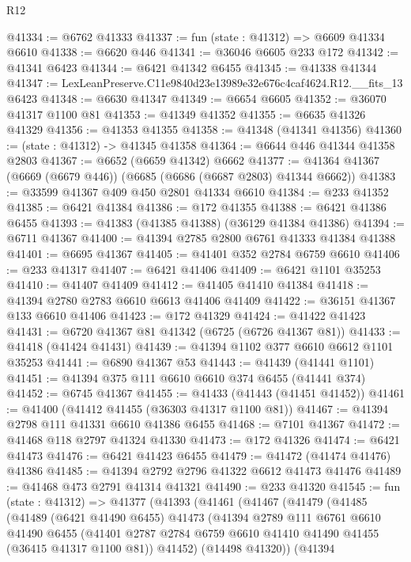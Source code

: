 \begin{lexlean}{R12}
\begin{coremodule}
@41334 := @6762 @41333
@41337 := fun (state : @41312) => @6609 @41334 @6610
@41338 := @6620 @446
@41341 := @36046 @6605 @233 @172
@41342 := @41341 @6423
@41344 := @6421 @41342 @6455
@41345 := @41338 @41344
@41347 := LexLeanPreserve.C11e9840d23e13989e32e676c4caf4624.R12.__fits_13 @6423
@41348 := @6630 @41347
@41349 := @6654 @6605
@41352 := @36070 @41317 @1100 @81
@41353 := @41349 @41352
@41355 := @6635 @41326 @41329
@41356 := @41353 @41355
@41358 := @41348 (@41341 @41356)
@41360 := (state : @41312) -> @41345 @41358
@41364 := @6644 @446 @41344 @41358 @2803
@41367 := @6652 (@6659 @41342) @6662
@41377 := @41364 @41367 (@6669 (@6679 @446)) (@6685 (@6686 (@6687 @2803) @41344 @6662))
@41383 := @33599 @41367 @409 @450 @2801 @41334 @6610
@41384 := @233 @41352
@41385 := @6421 @41384
@41386 := @172 @41355
@41388 := @6421 @41386 @6455
@41393 := @41383 (@41385 @41388) (@36129 @41384 @41386)
@41394 := @6711 @41367
@41400 := @41394 @2785 @2800 @6761 @41333 @41384 @41388
@41401 := @6695 @41367
@41405 := @41401 @352 @2784 @6759 @6610
@41406 := @233 @41317
@41407 := @6421 @41406
@41409 := @6421 @1101 @35253
@41410 := @41407 @41409
@41412 := @41405 @41410 @41384
@41418 := @41394 @2780 @2783 @6610 @6613 @41406 @41409
@41422 := @36151 @41367 @133 @6610 @41406
@41423 := @172 @41329
@41424 := @41422 @41423
@41431 := @6720 @41367 @81 @41342 (@6725 (@6726 @41367 @81))
@41433 := @41418 (@41424 @41431)
@41439 := @41394 @1102 @377 @6610 @6612 @1101 @35253
@41441 := @6890 @41367 @53
@41443 := @41439 (@41441 @1101)
@41451 := @41394 @375 @111 @6610 @6610 @374 @6455 (@41441 @374)
@41452 := @6745 @41367
@41455 := @41433 (@41443 (@41451 @41452))
@41461 := @41400 (@41412 @41455 (@36303 @41317 @1100 @81))
@41467 := @41394 @2798 @111 @41331 @6610 @41386 @6455
@41468 := @7101 @41367
@41472 := @41468 @118 @2797 @41324 @41330
@41473 := @172 @41326
@41474 := @6421 @41473
@41476 := @6421 @41423 @6455
@41479 := @41472 (@41474 @41476) @41386
@41485 := @41394 @2792 @2796 @41322 @6612 @41473 @41476
@41489 := @41468 @473 @2791 @41314 @41321
@41490 := @233 @41320
@41545 := fun (state : @41312) =>
  @41377
    (@41393
      (@41461
        (@41467
          (@41479
            (@41485
              (@41489
                (@6421 @41490 @6455)
                @41473
                (@41394
                  @2789
                  @111
                  @6761
                  @6610
                  @41490
                  @6455
                  (@41401 @2787 @2784 @6759 @6610 @41410 @41490 @41455 (@36415 @41317 @1100 @81))
                  @41452)
                (@14498 @41320))
              (@41394

\end{coremodule}
\end{lexlean}
